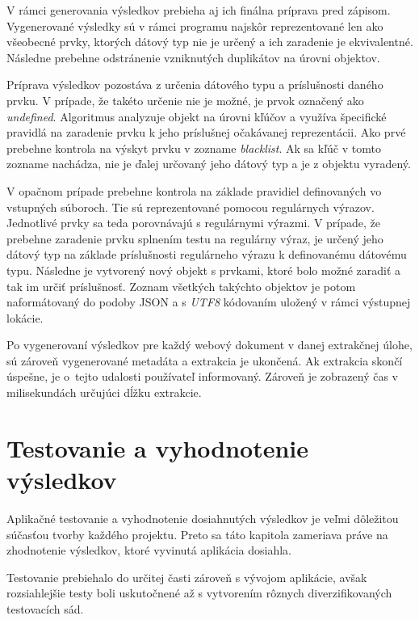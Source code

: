V rámci generovania výsledkov prebieha aj ich finálna príprava pred zápisom. Vygenerované výsledky sú v rámci programu najskôr reprezentované len ako všeobecné prvky, ktorých dátový typ nie je určený a ich zaradenie je ekvivalentné. Následne prebehne odstránenie vzniknutých duplikátov na úrovni objektov. 

Príprava výsledkov pozostáva z určenia dátového typu a príslušnosti daného prvku. V prípade, že takéto určenie nie je možné, je prvok označený ako \textit{undefined}. Algoritmus analyzuje objekt na úrovni kľúčov a využíva špecifické pravidlá na zaradenie prvku k jeho príslušnej očakávanej reprezentácii. Ako prvé prebehne kontrola na výskyt prvku v zozname \textit{blacklist}. Ak sa kľúč v tomto zozname nachádza, nie je ďalej určovaný jeho dátový typ a je z objektu vyradený. 

V opačnom prípade prebehne kontrola na základe pravidiel definovaných vo vstupných súboroch. Tie sú reprezentované pomocou regulárnych výrazov. Jednotlivé prvky sa teda porovnávajú s regulárnymi výrazmi. V prípade, že prebehne zaradenie prvku splnením testu na regulárny výraz, je určený jeho dátový typ na základe príslušnosti regulárneho výrazu k definovanému dátovému typu. Následne je vytvorený nový objekt s prvkami, ktoré bolo možné zaradiť a tak im určiť príslušnosť. Zoznam všetkých takýchto objektov je potom naformátovaný do podoby JSON a s \textit{UTF8} kódovaním uložený v rámci výstupnej lokácie. 

\bigskip

Po vygenerovaní výsledkov pre každý webový dokument v danej extrakčnej úlohe, sú zároveň vygenerované metadáta a extrakcia je ukončená. Ak extrakcia skončí úspešne, je o~tejto udalosti používateľ informovaný. Zároveň je zobrazený čas v milisekundách určujúci dĺžku extrakcie.

\chapter{Testovanie a vyhodnotenie výsledkov}
\label{testing}

Aplikačné testovanie a vyhodnotenie dosiahnutých výsledkov je veľmi dôležitou súčasťou tvorby každého projektu. Preto sa táto kapitola zameriava práve na zhodnotenie výsledkov, ktoré vyvinutá aplikácia dosiahla. 

Testovanie prebiehalo do určitej časti zároveň s vývojom aplikácie, avšak rozsiahlejšie testy boli uskutočnené až s vytvorením rôznych diverzifikovaných testovacích sád.

